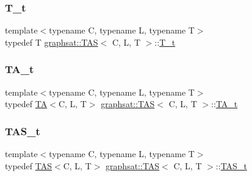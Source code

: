 \mbox{\label{classgraphsat_1_1_t_a_s_abbc05c03de984fb78282fd1feaf13c41}} 
\subsubsection{\texorpdfstring{T\_t}{T\_t}}
{\footnotesize\ttfamily template$<$typename C, typename L, typename T$>$ \\
typedef T \mbox{\hyperlink{classgraphsat_1_1_t_a_s}{graphsat\+::\+T\+AS}}$<$ C, L, T $>$\+::\mbox{\hyperlink{classgraphsat_1_1_t_a_s_abbc05c03de984fb78282fd1feaf13c41}{T\+\_\+t}}}

\mbox{\label{classgraphsat_1_1_t_a_s_a74d326d2d6c5868f7394bfd460544a3b}} 
\subsubsection{\texorpdfstring{TA\_t}{TA\_t}}
{\footnotesize\ttfamily template$<$typename C, typename L, typename T$>$ \\
typedef \mbox{\hyperlink{classgraphsat_1_1_t_a}{TA}}$<$C, L, T$>$ \mbox{\hyperlink{classgraphsat_1_1_t_a_s}{graphsat\+::\+T\+AS}}$<$ C, L, T $>$\+::\mbox{\hyperlink{classgraphsat_1_1_t_a_s_a74d326d2d6c5868f7394bfd460544a3b}{T\+A\+\_\+t}}}

\mbox{\label{classgraphsat_1_1_t_a_s_aecb0fd9555b0cf9c3e73927d32a437d7}} 
\subsubsection{\texorpdfstring{TAS\_t}{TAS\_t}}
{\footnotesize\ttfamily template$<$typename C, typename L, typename T$>$ \\
typedef \mbox{\hyperlink{classgraphsat_1_1_t_a_s}{T\+AS}}$<$C, L, T$>$ \mbox{\hyperlink{classgraphsat_1_1_t_a_s}{graphsat\+::\+T\+AS}}$<$ C, L, T $>$\+::\mbox{\hyperlink{classgraphsat_1_1_t_a_s_aecb0fd9555b0cf9c3e73927d32a437d7}{T\+A\+S\+\_\+t}}}

